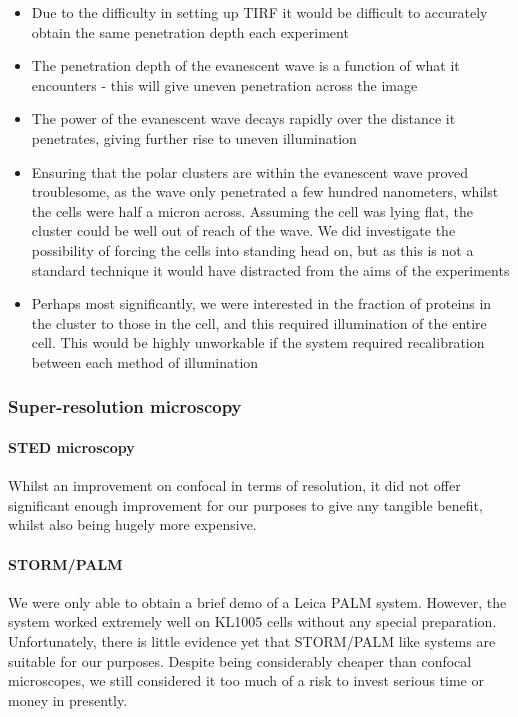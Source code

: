 \documentclass[../main.tex]{subfiles}
\begin{document}
\begin{itemize}
	\item Due to the difficulty in setting up TIRF it would be difficult to accurately obtain the same penetration depth each experiment
	\item The penetration depth of the evanescent wave is a function of what it encounters - this will give uneven penetration across the image
	\item The power of the evanescent wave decays rapidly over the distance it penetrates, giving further rise to uneven illumination
	\item Ensuring that the polar clusters are within the evanescent wave proved troublesome, as the wave only penetrated a few hundred nanometers, whilst the cells were half a micron across. Assuming the cell was lying flat, the cluster could be well out of reach of the wave. We did investigate the possibility of forcing the cells into standing head on, but as this is not a standard technique it would have distracted from the aims of the experiments
	\item Perhaps most significantly, we were interested in the fraction of proteins in the cluster to those in the cell, and this required illumination of the entire cell. This would be highly unworkable if the system required recalibration between each method of illumination
\end{itemize}

\subsubsection{Super-resolution microscopy}

\paragraph{STED microscopy} Whilst an improvement on confocal in terms of resolution, it did not offer significant enough improvement for our purposes to give any tangible benefit, whilst also being hugely more expensive.

\paragraph{STORM/PALM} We were only able to obtain a brief demo of a Leica PALM system. However, the system worked extremely well on KL1005 cells without any special preparation. Unfortunately, there is little evidence yet that STORM/PALM like systems are suitable for our purposes. Despite being considerably cheaper than confocal microscopes, we still considered it too much of a risk to invest serious time or money in presently.
\end{document}
